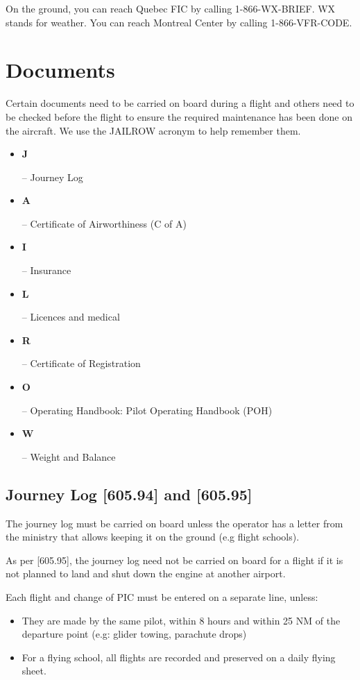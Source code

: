 \documentclass[12pt,letterpaper]{article}
\begin{document}
        On the ground, you can reach Quebec FIC by calling 1-866-WX-BRIEF. WX stands for weather. You can reach Montreal Center by calling 1-866-VFR-CODE.

    \clearpage
    \section{Documents}
    \begin{samepage}
    
    Certain documents need to be carried on board during a flight and others need to be checked before the flight to ensure the required maintenance has been done on the aircraft. We use the JAILROW acronym to help remember them.
    
    \begin{itemize}
        \item \parbox[t]{0.4cm}{\textbf{J}} -- Journey Log
        \item \parbox[t]{0.4cm}{\textbf{A}} -- Certificate of Airworthiness (C of A)
        \item \parbox[t]{0.4cm}{\textbf{I}} -- Insurance
        \item \parbox[t]{0.4cm}{\textbf{L}} -- Licences and medical
        \item \parbox[t]{0.4cm}{\textbf{R}} -- Certificate of Registration 
        \item \parbox[t]{0.4cm}{\textbf{O}} -- Operating Handbook:  Pilot Operating Handbook (POH)
        \item \parbox[t]{0.4cm}{\textbf{W}} -- Weight and Balance
    \end{itemize}
    \end{samepage}

    \subsection{Journey Log [605.94] and [605.95]}
    
    The journey log must be carried on board unless the operator has a letter from the ministry that allows keeping it on the ground (e.g flight schools).
    
    As per [605.95], the journey log need not be carried on board for a flight if it is not planned to land and shut down the engine at another airport.
    
    Each flight and change of PIC must be entered on a separate line, unless:
    \begin{itemize}
        \item They are made by the same pilot, within 8 hours and within 25 NM of the departure point (e.g: glider towing, parachute drops)
        \item For a flying school, all flights are recorded and preserved on a daily flying sheet.
    \end{itemize}
    
\end{document}
